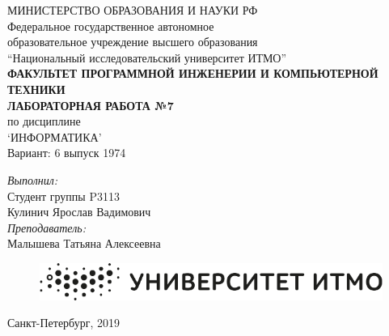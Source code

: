 \vspace*{4mm}
\begin{center}
МИНИСТЕРСТВО ОБРАЗОВАНИЯ И НАУКИ РФ\\
\hfill \break
Федеральное государственное автономное\\ 
образовательное учреждение высшего образования\\
``Национальный исследовательский университет ИТМО''\\
\hfill \break
\textbf{ФАКУЛЬТЕТ ПРОГРАММНОЙ ИНЖЕНЕРИИ И КОМПЬЮТЕРНОЙ ТЕХНИКИ}\\
\vspace{2cm}
\large{\textbf{ЛАБОРАТОРНАЯ РАБОТА №7}}\\
по дисциплине\\
\large{`ИНФОРМАТИКА'}\\
\hfill \break
Вариант: 6 выпуск 1974\\
\end{center}

\vspace{5cm}
 
\begin{flushright}
\textit{Выполнил:}\\
Студент группы P3113\\
Кулинич Ярослав Вадимович\\
\textit{Преподаватель:}\\
Малышева Татьяна Алексеевна\\
\end{flushright}
 
\vspace{3cm}

\begin{figure}[h]
\centering
\includegraphics[scale=0.3]{itmo}
\end{figure}
\begin{center} Санкт-Петербург, 2019 \end{center}

\newpage